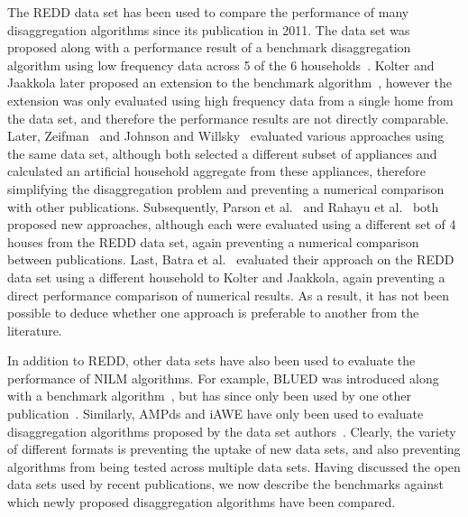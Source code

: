 \documentclass{sig-alternate}
\begin{document}
The REDD data set has been used to compare the performance of many disaggregation algorithms since its publication in 2011. The data set was proposed along with a performance result of a benchmark disaggregation algorithm using low frequency data across 5 of the 6 households~\cite{redd}. Kolter and Jaakkola later proposed an extension to the benchmark algorithm~\cite{kolter_2012}, however the extension was only evaluated using high frequency data from a single home from the data set, and therefore the performance results are not directly comparable. Later, Zeifman~\cite{zeifman_2012} and Johnson and Willsky~\cite{johnson_2013} evaluated various approaches using the same data set, although both selected a different subset of appliances and calculated an artificial household aggregate from these appliances, therefore simplifying the disaggregation problem and preventing a numerical comparison with other publications. Subsequently, Parson et al.~\cite{parson_2012} and Rahayu et al.~\cite{rahayu_2012} both proposed new approaches, although each were evaluated using a different set of 4 houses from the REDD data set, again preventing a numerical comparison between publications. Last, Batra et al.~\cite{batra_2013} evaluated their approach on the REDD data set using a different household to Kolter and Jaakkola, again preventing a direct performance comparison of numerical results. As a result, it has not been possible to deduce whether one approach is preferable to another from the literature.

In addition to REDD, other data sets have also been used to evaluate the performance of NILM algorithms. For example, BLUED was introduced along with a benchmark algorithm~\cite{blued}, but has since only been used by one other publication~\cite{anderson_2012}. Similarly, AMPds and iAWE have only been used to evaluate disaggregation algorithms proposed by the data set authors~\cite{ampds,iawe}. Clearly, the variety of different formats is preventing the uptake of new data sets, and also preventing algorithms from being tested across multiple data sets. Having discussed the open data sets used by recent publications, we now describe the benchmarks against which newly proposed disaggregation algorithms have been compared.
\end{document}
